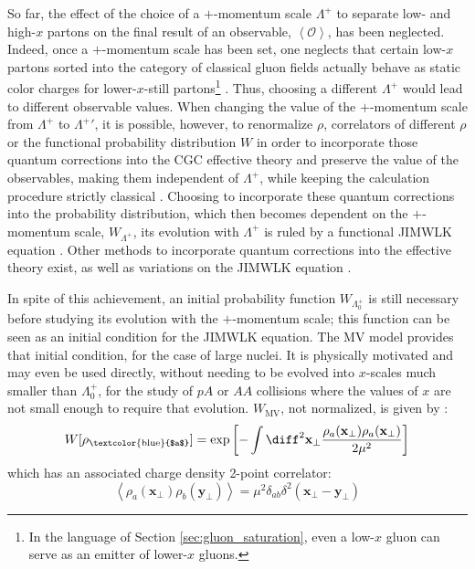So far, the effect of the choice of a $+$-momentum scale $\Lambda^+$ to separate low- and high-$x$ partons on the final result of an observable, $\left< \mathcal{O} \right>$, has been neglected. Indeed, once a $+$-momentum scale has been set, one neglects that certain low-$x$ partons sorted into the category of classical gluon fields actually behave as static color charges for lower-$x$-still partons\footnote{In the language of Section \ref{sec:gluon_saturation}, even a low-$x$ gluon can serve as an emitter of lower-$x$ gluons.} \cite{Albacete_2014}. Thus, choosing a different $\Lambda^+$ would lead to different observable values. When changing the value of the $+$-momentum scale from $\Lambda^+$ to ${\Lambda^+}'$, it is possible, however, to renormalize $\rho$, correlators of different $\rho$ or the functional probability distribution  $W$ in order to incorporate those quantum corrections into the \gls{CGC} effective theory and preserve the value of the observables, making them independent of $\Lambda^+$, while keeping the calculation procedure strictly classical \citep{Albacete_2014}. Choosing to incorporate these quantum corrections into the probability distribution, which then becomes dependent on the $+$-momentum scale, $W_{\Lambda^+}$, its evolution with $\Lambda^+$ is ruled by a functional \gls{JIMWLK} equation \cite{Gelis_2010}. Other methods to incorporate quantum corrections into the effective theory exist, as well as variations on the \gls{JIMWLK} equation \citep{Albacete_2014}.

In spite of this achievement, an initial probability function $W_{\Lambda^+_0}$ is still necessary before studying its evolution with the $+$-momentum scale; this function can be seen as an initial condition for the \gls{JIMWLK} equation. The \gls{MV} model provides that initial condition, for the case of large nuclei. It is physically motivated and may even be used directly, without needing to be evolved into $x$-scales much smaller than $\Lambda_0^+$, for the study of $pA$ or $AA$ collisions where the values of $x$ are not small enough to require that evolution. \citep{Gelis_2010}  $W_{\text{MV}}$, not normalized, is given by \citep{Gelis_Habilitation}:
\begin{equation}
	W[\rho_\text{\textcolor{blue}{$a$}}] = \exp \left[ - \int \diff^2 \mathbf{x}_\perp \frac{\rho_a(\mathbf{x_\perp})\rho_a(\mathbf{x_\perp})}{2 \mu^2} \right]
\end{equation}
which has an associated charge density 2-point correlator:
\begin{equation}
	\left< \rho_a(\mathbf{x}_\perp) \rho_b (\mathbf{y}_\perp) \right> = \mu^2 \delta_{ab} \delta^2 (\mathbf{x}_\perp - \mathbf{y}_\perp)
\end{equation}

